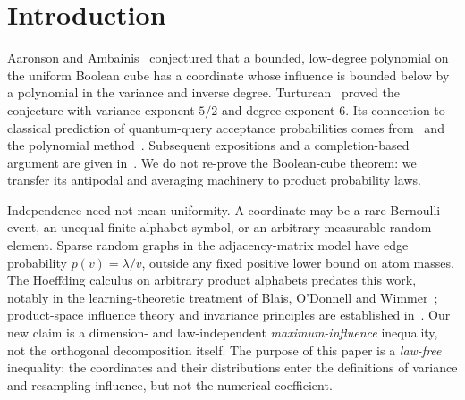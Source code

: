 \documentclass[11pt]{article}
\numberwithin{equation}{section}
\theoremstyle{remark}
\begin{document}
\section{Introduction}\label{sec:intro}
Aaronson and Ambainis~\cite[Conjecture~1.7]{AA14} conjectured that a bounded, low-degree polynomial on the uniform Boolean cube has a coordinate whose influence is bounded below by a polynomial in the variance and inverse degree. Turturean~\cite[Theorem~1.1]{Tur26} proved the conjecture with variance exponent $5/2$ and degree exponent $6$. Its connection to classical prediction of quantum-query acceptance probabilities comes from~\cite[Theorem~3.3]{AA14} and the polynomial method~\cite{BBCMW01}. Subsequent expositions and a completion-based argument are given in~\cite{BDST26,HMP26}. We do not re-prove the Boolean-cube theorem: we transfer its antipodal and averaging machinery to product probability laws.

Independence need not mean uniformity. A coordinate may be a rare Bernoulli event, an unequal finite-alphabet symbol, or an arbitrary measurable random element. Sparse random graphs in the adjacency-matrix model have edge probability $p(v)=\lambda/v$, outside any fixed positive lower bound on atom masses. The Hoeffding calculus on arbitrary product alphabets predates this work, notably in the learning-theoretic treatment of Blais, O'Donnell and Wimmer~\cite{BOW08}; product-space influence theory and invariance principles are established in~\cite{GJN12,MOO10}. Our new claim is a dimension- and law-independent \emph{maximum-influence} inequality, not the orthogonal decomposition itself. The purpose of this paper is a \emph{law-free} inequality: the coordinates and their distributions enter the definitions of variance and resampling influence, but not the numerical coefficient.
\end{document}
